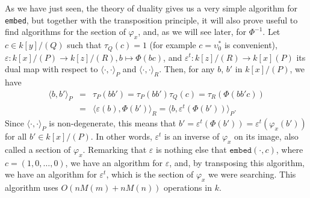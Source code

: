 \documentclass[a4paper,11pt]{article}
\theoremstyle{break}
\theoremstyle{definition}
\theoremstyle{remark}
\newcommand{\ps}[2]{\langle#1,#2\rangle}
\newcommand{\psdot}{\ps{\cdot}{\cdot}}
\begin{document}
As we have just seen, the theory of duality gives us a very simple algorithm for
\texttt{embed}, but together with the transposition principle, it will also
prove useful to find algorithms for the section of $\varphi_x$, and, as we will
see later, for $\Phi^{-1}$. Let $c\in k[y]/(Q)$ such that $\tau_Q(c)=1$ (for
example $c=\upsilon^*_0$ is convenient), $\varepsilon:k[x]/(P)\to k[z]/(R),
b\mapsto \Phi(bc)$, and $\varepsilon^t:k[z]/(R)\to k[x](P)$ its dual map with
respect to $\psdot_P$ and $\psdot_R$. Then, for any $b$, $b'$ in $k[x]/(P)$, we
have
\[
\begin{array}{rcl}
  \ps{b}{b'}_P &=& \tau_P(bb') = \tau_P(bb')\tau_Q(c) = \tau_R(\Phi(bb'c))\\
  &=& \ps{\varepsilon(b)}{\Phi(b')}_R = \ps{b}{\varepsilon^t(\Phi(b'))}_P.
\end{array}
\]
Since $\psdot_P$ is non-degenerate, this means that 
$b'=\varepsilon^t(\Phi(b'))=\varepsilon^t(\varphi_x(b'))$ for all $b'\in 
k[x]/(P)$. In other words, $\varepsilon^t$ is an inverse of $\varphi_x$ on its 
image, also called a section of $\varphi_x$. Remarking that $\varepsilon$ is 
nothing else that $\texttt{embed}(\cdot,c)$, where $c=(1,0,\dots,0)$, we have 
an algorithm for $\varepsilon$, and, by transposing this algorithm, we have an 
algorithm for $\varepsilon^t$, which is the section of $\varphi_x$ we were 
searching. This algorithm uses $O(nM(m)+nM(n))$ operations in $k$.
\end{document}
